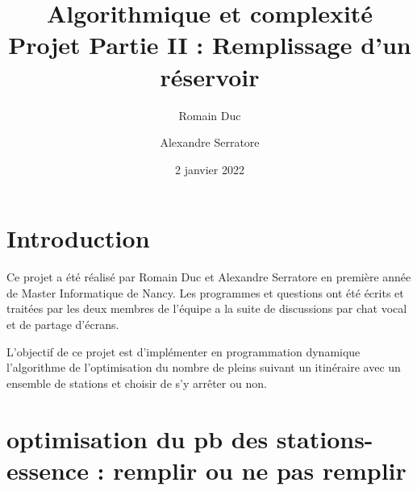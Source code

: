\documentclass[a4paper,11pt]{article}
\title{Algorithmique et complexité Projet Partie II : Remplissage d'un réservoir}
\author{Romain Duc \and Alexandre Serratore}
\date{2 janvier 2022}
\begin{document}
    \maketitle
    \newpage

    \section{Introduction}\label{sec:introduction}
        Ce projet a été réalisé par Romain Duc et Alexandre Serratore en première année de Master Informatique de Nancy.
        Les programmes et questions ont été écrits et traitées par les deux membres de l'équipe a la suite de discussions par chat vocal et de partage d'écrans.

        L'objectif de ce projet est d'implémenter en programmation dynamique l'algorithme de l'optimisation du nombre de pleins suivant un itinéraire avec un ensemble de stations et choisir de s'y arrêter ou non.
        
    
    \section{optimisation du pb des stations-essence : remplir ou ne pas remplir}
\end{document}
